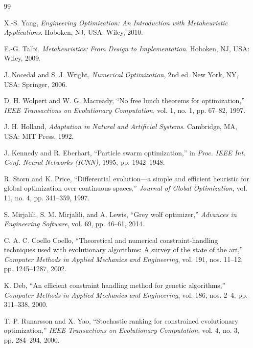 \documentclass[journal]{IEEEtran}
\begin{document}
\begin{thebibliography}{99}

X.-S. Yang, \emph{Engineering Optimization: An Introduction with Metaheuristic Applications}. Hoboken, NJ, USA: Wiley, 2010.

E.-G. Talbi, \emph{Metaheuristics: From Design to Implementation}. Hoboken, NJ, USA: Wiley, 2009.

J. Nocedal and S. J. Wright, \emph{Numerical Optimization}, 2nd ed. New York, NY, USA: Springer, 2006.

D. H. Wolpert and W. G. Macready, ``No free lunch theorems for optimization,'' \emph{IEEE Transactions on Evolutionary Computation}, vol. 1, no. 1, pp. 67--82, 1997.

J. H. Holland, \emph{Adaptation in Natural and Artificial Systems}. Cambridge, MA, USA: MIT Press, 1992.

J. Kennedy and R. Eberhart, ``Particle swarm optimization,'' in \emph{Proc. IEEE Int. Conf. Neural Networks (ICNN)}, 1995, pp. 1942--1948.

R. Storn and K. Price, ``Differential evolution---a simple and efficient heuristic for global optimization over continuous spaces,'' \emph{Journal of Global Optimization}, vol. 11, no. 4, pp. 341--359, 1997.

S. Mirjalili, S. M. Mirjalili, and A. Lewis, ``Grey wolf optimizer,'' \emph{Advances in Engineering Software}, vol. 69, pp. 46--61, 2014.

C. A. C. Coello Coello, ``Theoretical and numerical constraint-handling techniques used with evolutionary algorithms: A survey of the state of the art,'' \emph{Computer Methods in Applied Mechanics and Engineering}, vol. 191, nos. 11--12, pp. 1245--1287, 2002.

K. Deb, ``An efficient constraint handling method for genetic algorithms,'' \emph{Computer Methods in Applied Mechanics and Engineering}, vol. 186, nos. 2--4, pp. 311--338, 2000.

T. P. Runarsson and X. Yao, ``Stochastic ranking for constrained evolutionary optimization,'' \emph{IEEE Transactions on Evolutionary Computation}, vol. 4, no. 3, pp. 284--294, 2000.


\end{thebibliography}
\end{document}
